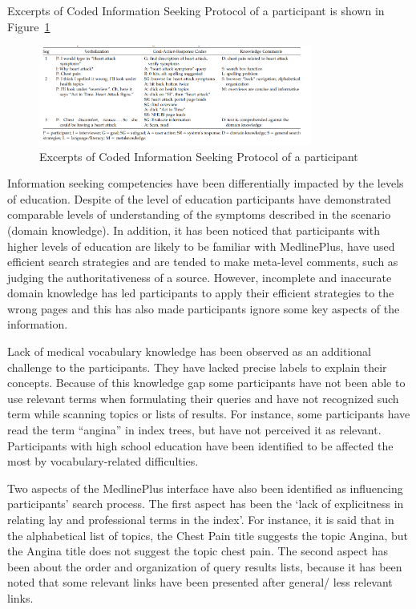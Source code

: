\documentclass[]{article}
\begin{document}
Excerpts of Coded Information Seeking Protocol of a participant is shown in Figure~\ref{fig14}

\begin{figure}[t!]
	\includegraphics[width=0.8\textwidth]{Capture14.png}
	\caption{Excerpts of Coded Information Seeking Protocol of a participant \label{fig14}}
\end{figure}

Information seeking competencies have been differentially impacted by the levels of education. Despite of the level of education participants have demonstrated comparable levels of understanding of the symptoms described in the scenario (domain knowledge). In addition, it has been noticed that participants with higher levels of education are likely to be familiar with MedlinePlus, have used efficient search strategies and are tended to make meta-level comments, such as judging the authoritativeness of a source. However, incomplete and inaccurate domain knowledge has led participants to apply their efficient strategies to the wrong pages and this has also made participants ignore some key aspects of the information. 

Lack of medical vocabulary knowledge has been observed as an additional challenge to the participants. They have lacked precise labels to explain their concepts. Because of this knowledge gap some participants have not been able to use relevant terms when formulating their queries and have not recognized such term while scanning topics or lists of results. For instance, some participants have read the term “angina” in index trees, but have not perceived it as relevant. Participants with high school education have been identified to be affected the most by vocabulary-related difficulties.   
        
Two aspects of the MedlinePlus interface have also been identified as influencing participants’ search process. The first aspect has been the ‘lack of explicitness in relating lay and professional terms in the index’. For instance, it is said that in the alphabetical list of topics, the Chest Pain title suggests the topic Angina, but the Angina title does not suggest the topic chest pain. The second aspect has been about the order and organization of query results lists, because it has been noted that some relevant links have been presented after general/ less relevant links.   
\end{document}
